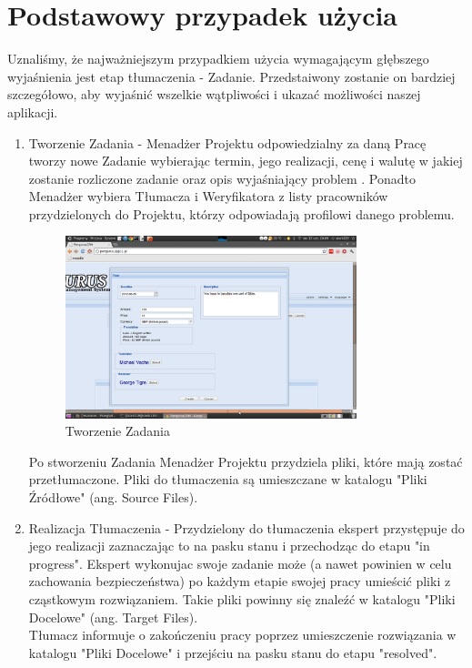 \documentclass[licencjacka]{pracamgr}
\begin{document}
\section{Podstawowy przypadek użycia}
Uznaliśmy, że najważniejszym przypadkiem użycia wymagającym głębszego wyjaśnienia jest etap tłumaczenia - Zadanie. Przedstaiwony zostanie on bardziej szczegółowo, aby wyjaśnić wszelkie wątpliwości i ukazać możliwości naszej aplikacji.

\begin{enumerate}
\item	Tworzenie Zadania - Menadżer Projektu odpowiedzialny za daną Pracę tworzy nowe Zadanie wybierając termin, jego realizacji, cenę i walutę w jakiej zostanie rozliczone zadanie oraz opis wyjaśniający problem . Ponadto Menadżer wybiera Tłumacza i Weryfikatora z listy pracowników przydzielonych do Projektu, którzy odpowiadają profilowi danego problemu. \\
\begin{figure}[h!]
\centering
\includegraphics[width=0.8\textwidth]{resources/task_create.png}
\caption{Tworzenie Zadania}
\end{figure}
Po stworzeniu Zadania Menadżer Projektu przydziela pliki, które mają zostać przetłumaczone. Pliki do tłumaczenia są umieszczane w katalogu "Pliki Źródłowe" (ang. Source Files).
\item 	Realizacja Tłumaczenia - Przydzielony do tłumaczenia ekspert przystępuje do jego realizacji zaznaczając to na pasku stanu i przechodząc do etapu "in progress". Ekspert wykonujac swoje zadanie może (a nawet powinien w celu zachowania bezpieczeństwa) po każdym etapie swojej pracy umieścić pliki z cząstkowym rozwiązaniem. Takie pliki powinny się znaleźć w katalogu "Pliki Docelowe" (ang. Target Files).\\
Tłumacz informuje o zakończeniu pracy poprzez umieszczenie rozwiązania w katalogu "Pliki Docelowe" i przejściu na pasku stanu do etapu "resolved".   

\end{enumerate}
\end{document}
